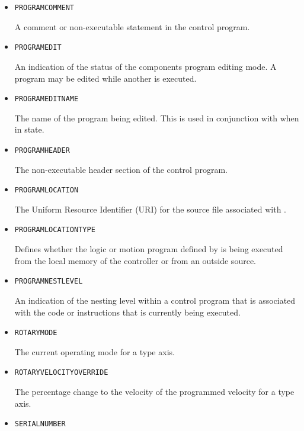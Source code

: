 \begin{itemize}
\item \texttt{PROGRAM\textunderscore COMMENT}  

A comment or non-executable statement in the control program.


\item \texttt{PROGRAM\textunderscore EDIT}  

An indication of the status of the  components program editing mode. A program may be edited while another is executed.


\item \texttt{PROGRAM\textunderscore EDIT\textunderscore NAME}  

The name of the program being edited. 
 This is used in conjunction with  when in  state. 


\item \texttt{PROGRAM\textunderscore HEADER}  

The non-executable header section of the control program.


\item \texttt{PROGRAM\textunderscore LOCATION}  

The Uniform Resource Identifier (URI) for the source file associated with .


\item \texttt{PROGRAM\textunderscore LOCATION\textunderscore TYPE}  

Defines whether the logic or motion program defined by  is being executed from the local memory of the controller or from an outside source.


\item \texttt{PROGRAM\textunderscore NEST\textunderscore LEVEL}  

An indication of the nesting level within a control program that is associated with the code or instructions that is currently being executed.


\item \texttt{ROTARY\textunderscore MODE}  

The current operating mode for a  type axis.


\item \texttt{ROTARY\textunderscore VELOCITY\textunderscore OVERRIDE}  

The percentage change to the velocity of the programmed velocity for a  type axis.


\item \texttt{SERIAL\textunderscore NUMBER}  


\end{itemize}
